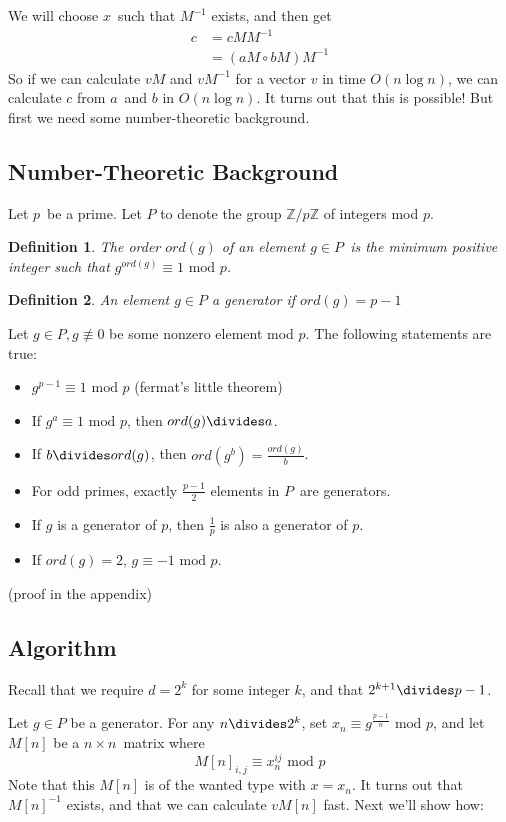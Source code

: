 \documentclass{article}
\newtheorem{definition}{Definition}[section]
\begin{document}
We will choose $x$ such that $M^{-1}$ exists, and then get
\begin{align*}
c	&= cMM^{-1}\\
	&= (aM \circ bM)M^{-1}
\end{align*}
So if we can calculate $vM$ and $vM^{-1}$ for a vector $v$ in time $O(n \log n)$, we can calculate $c$ from $a$ and $b$ in $O(n \log n)$.
It turns out that this is possible! But first we need some number-theoretic background.

\subsection{Number-Theoretic Background}
Let $p$ be a prime. Let $P$ to denote the group $\mathbb{Z}/p\mathbb{Z}$ of integers mod $p$. 

\begin{definition}
The order $ord(g)$ of an element $g \in P$ is the minimum positive integer such that $g^{ord(g)} \equiv 1 \text{ mod } p$.
\end{definition}
\begin{definition}
An element $g \in P$ a generator if $ord(g) = p-1$
\end{definition}

Let $g \in P, g \not\equiv 0$ be some nonzero element mod $p$. The following statements are true:
\begin{itemize}
	\item $g^{p-1} \equiv 1 \text{ mod } p$ (fermat's little theorem)
	\item If $g^{a} \equiv 1 \text{ mod } p$, then $ord(g) \divides a$.
	\item If $b \divides ord(g)$, then $ord(g^{b}) = \frac{ord(g)}{b}$.
	\item For odd primes, exactly $\frac{p-1}{2}$ elements in $P$ are generators.
	\item If $g$ is a generator of $p$, then $\frac{1}{p}$ is also a generator of $p$.
	\item If $ord(g) = 2$, $g \equiv -1 \text{ mod } p$.
\end{itemize}
(proof in the appendix)

\subsection{Algorithm}
Recall that we require $d = 2^{k}$ for some integer $k$, and that $2^{k+1} \divides p-1$.

Let $g \in P$ be a generator. For any $n \divides 2^{k}$, set $x_{n} \equiv g^{\frac{p-1}{n}} \text{ mod } p$, and let $M[n]$ be a $n \times n$ matrix where
\begin{equation*}
M[n]_{i,j} \equiv x_{n}^{ij} \text{ mod } p
\end{equation*}
Note that this $M[n]$ is of the wanted type with $x = x_{n}$. It turns out that $M[n]^{-1}$ exists, and that we can calculate $vM[n]$ fast. Next we'll show how:
\end{document}
